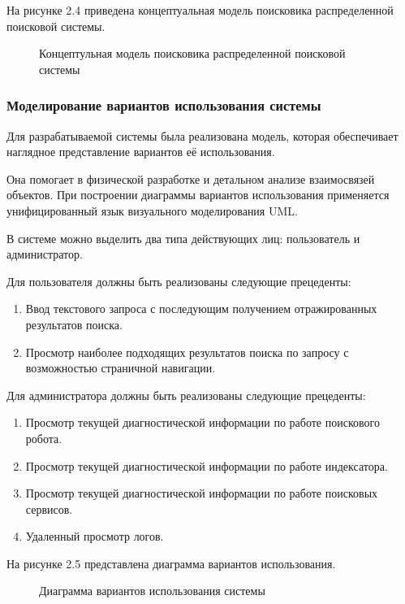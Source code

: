 На рисунке 2.4 приведена концептуальная модель поисковика распределенной поисковой системы.

\begin{figure}
\caption{Концептульная модель поисковика распределенной поисковой системы}
\label{concept_searcher_model:image}
\end{figure}

\subsubsection{Моделирование вариантов использования системы}

Для разрабатываемой системы была реализована модель, которая обеспечивает наглядное представление вариантов её использования.

Она помогает в физической разработке и детальном анализе взаимосвязей объектов. При построении диаграммы вариантов использования применяется унифицированный язык визуального моделирования UML.

В системе можно выделить два типа действующих лиц: пользователь и администратор. 

Для пользователя должны быть реализованы следующие прецеденты:
\begin{enumerate}
\item Ввод текстового запроса с последующим получением отражированных результатов поиска.
\item Просмотр наиболее подходящих результатов поиска по запросу с возможностью страничной навигации.
\end{enumerate}

Для администратора должны быть реализованы следующие прецеденты:
\begin{enumerate}
\item Просмотр текущей диагностической информации по работе поискового робота.
\item Просмотр текущей диагностической информации по работе индексатора.
\item Просмотр текущей диагностической информации по работе  поисковых сервисов.
\item Удаленный просмотр логов.
\end{enumerate}

На рисунке 2.5 представлена диаграмма вариантов использования.

\begin{figure}
\caption{Диаграмма вариантов использования системы}
\label{diagram_usecases:image}
\end{figure}

